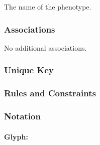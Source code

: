 \begin{attributes}
   The name of the phenotype.
\end{attributes}

\subsubsection{Associations}

No additional associations.

\subsubsection{Unique Key}

\begin{logicalkey}
\item {}
\item {}
\end{logicalkey}

\subsubsection{Rules and Constraints}

\begin{valrules}
\end{valrules}


\subsubsection{Notation}

\paragraph{Glyph: }
\label{sec:techref:phenotype}


